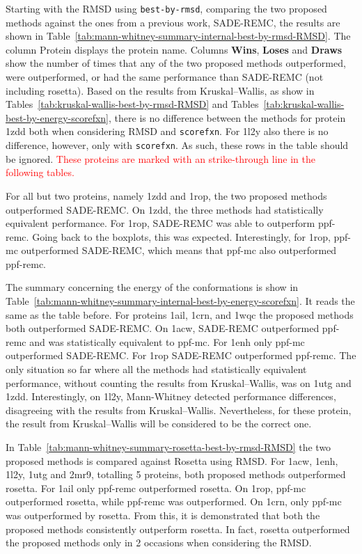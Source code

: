 Starting with the RMSD using \texttt{best-by-rmsd}, comparing the two proposed
methods against the ones from a previous work, SADE-REMC, the results are shown in
Table~\ref{tab:mann-whitney-summary-internal-best-by-rmsd-RMSD}. The column
Protein displays the protein name.
Columns \textbf{Wins}, \textbf{Loses} and \textbf{Draws} show the number of
times that any of the two proposed methods outperformed, were outperformed,
or had the same performance than SADE-REMC (not including rosetta).
Based on the results from Kruskal–Wallis, as show in
Tables~\ref{tab:kruskal-wallis-best-by-rmsd-RMSD} and
Tables~\ref{tab:kruskal-wallis-best-by-energy-scorefxn}, there is no
difference between the methods for protein 1zdd both when considering RMSD and
\texttt{scorefxn}. For 1l2y also there is no difference, however, only with
\texttt{scorefxn}. As such, these rows in the table should be ignored.
\textcolor{red}{
These proteins are marked with an strike-through line in the following tables.
}

For all but two proteins, namely 1zdd and 1rop, the two proposed methods outperformed SADE-REMC.
On 1zdd, the three methods had statistically equivalent performance. For
1rop, SADE-REMC was able to outperform ppf-remc. Going back to the boxplots,
this was expected. Interestingly, for 1rop, ppf-mc outperformed SADE-REMC, which means
that ppf-mc also outperformed ppf-remc.

The summary concerning the energy of the conformations is show in
Table~\ref{tab:mann-whitney-summary-internal-best-by-energy-scorefxn}. It
reads the same as the table before.
For proteins 1ail, 1crn, and 1wqc the proposed methods both outperformed
SADE-REMC. On 1acw, SADE-REMC outperformed ppf-remc and was statistically
equivalent to ppf-mc. For 1enh only ppf-mc outperformed SADE-REMC. For 1rop
SADE-REMC outperformed ppf-remc. The only situation so far where all the
methods had statistically equivalent performance, without counting the results
from Kruskal–Wallis, was on 1utg and 1zdd.
Interestingly, on 1l2y, Mann-Whitney detected performance differences, disagreeing with
the results from Kruskal–Wallis. Nevertheless, for these protein, the result
from Kruskal–Wallis will be considered to be the correct one.



In Table~\ref{tab:mann-whitney-summary-rosetta-best-by-rmsd-RMSD} the
two proposed methods is compared against Rosetta using RMSD. For 1acw, 1enh, 1l2y, 1utg and 2mr9, totalling 5 proteins, both
proposed methods outperformed rosetta. For 1ail only ppf-remc
outperformed rosetta. On 1rop, ppf-mc outperformed rosetta, while
ppf-remc was outperformed. On 1crn, only ppf-mc was outperformed
by rosetta. From this, it is demonstrated that both the proposed methods
consistently outperform rosetta. In fact, rosetta outperformed the proposed
methods only in 2 occasions when considering the RMSD.

